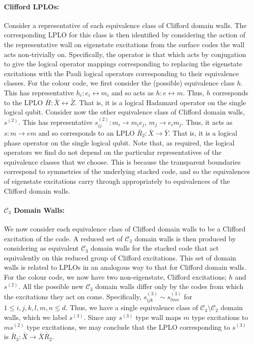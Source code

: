 \documentclass[pra,twocolumn,a4paper,nofootinbib]{revtex4-1}
\begin{document}
\paragraph*{Clifford LPLOs:} Consider a representative of each equivalence class of Clifford domain walls. The corresponding LPLO for this class is then identified by considering the action of the representative wall on eigenstate excitations from the surface codes the wall acts non-trivially on. Specifically, the operator is that which acts by conjugation to give the logical operator mappings corresponding to replacing the eigenstate excitations with the Pauli logical operators corresponding to their equivalence classes. For the colour code, we first consider the (possible) equivalence class $h$. This has representative $h_i: e_i \leftrightarrow m_i$ and so acts as $h: e \leftrightarrow m$. Thus, $h$ corresponds to the LPLO $\bar{H}: \bar{X} \leftrightarrow \bar{Z}$. That is, it is a logical Hadamard operator on the single logical qubit. Consider now the other equivalence class of Clifford domain walls, $s^{(2)}$. This has representative $s_{ij}^{(2)}: m_i \to m_i e_j$, $m_j \to e_i m_j$. Thus, it acts as $s: m \to em$ and so corresponds to an LPLO $\bar{R}_2: \bar{X} \to \bar{Y}$. That is, it is a logical phase operator on the single logical qubit. Note that, as required, the logical operators we find do not depend on the particular representatives of the equivalence classes that we choose. This is because the transparent boundaries correspond to symmetries of the underlying stacked code, and so the equivalences of eigenstate excitations carry through appropriately to equivalences of the Clifford domain walls.

\paragraph*{$\mathcal{C}_3$ Domain Walls:} We now consider each equivalence class of Clifford domain walls to be a Clifford excitation of the code. A reduced set of $\mathcal{C}_3$ domain walls is then produced by considering as equivalent $\mathcal{C}_3$ domain walls for the stacked code that act equivalently on this reduced group of Clifford excitations. This set of domain walls is related to LPLOs in an analogous way to that for Clifford domain walls. For the colour code, we now have two non-eigenstate, Clifford excitations; $h$ and $s^{(2)}$. All the possible new $\mathcal{C}_3$ domain walls differ only by the codes from which the excitations they act on come. Specifically, $s_{ijk}^{(3)} \sim s_{lmn}^{(3)}$ for $1 \leq i,j,k,l,m,n \leq d$. Thus, we have a single equivalence class of $\mathcal{C}_3 \setminus \mathcal{C}_2$ domain walls, which we label $s^{(3)}$. Since any $s^{(3)}$ type wall maps $m$ type excitations to $ms^{(2)}$ type excitations, we may conclude that the LPLO corresponding to $s^{(3)}$ is $\bar{R}_3: \bar{X} \to \bar{X}\bar{R}_2$.
\end{document}
